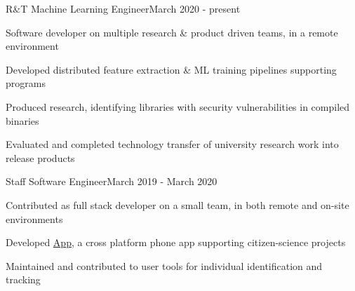\documentclass{article}
\newenvironment{**mylist}[2]{
  \subsubsection*{#1\hfill#2}
  \small
  \begin{list}{}{}
    \setlength{\topsep}{0pt}
   \setlength{\itemsep}{1pt}
   \setlength{\parskip}{0pt}
   \setlength{\parsep}{0pt}}{\end{list}\normalsize}
\newcommand{\LU}[1]{\hspace{-1em}{\bf Technologies : #1}}
\def\PT{{\bf(Part Time)}\xspace}
\begin{document}
\begin{comment}
\begin{**mylist}{Stealth Org \PT \tabb Security \& Tech Consultant}{April 2021 - present}
\item Setup technologies with a security forward perspective, including documented threat models
\item Provided resources to facilitate consolidating intelligence for a searchable library service
\item Developed tools used to monitor public streaming services and flag/share periods of interest
\item Evaluated \& incorporated Machine Learning models in facilitating search and other operations
\item \LU{Linux, NextCloud, 2FA, Signal, Tor Hidden Services, Django}
\end{**mylist}
\end{comment}

\begin{**mylist}{\href{https://www.grammatech.com}{} \tabb R\&T Machine Learning Engineer}{March 2020 - present}
\item Software developer on multiple research \& product driven teams, in a remote environment
\item Developed distributed feature extraction \& ML training pipelines supporting  programs
\item Produced research, identifying libraries with security vulnerabilities in compiled binaries
\item Evaluated and completed technology transfer of university research work into release products
\item \LU{Python, C, PyTorch, Docker, celery, Kibana, GitLab.ci, LevelDB, MongoDB}
\end{**mylist}

\begin{**mylist}{\href{www.happywhale.com}{} \tabb Staff Software Engineer}{March 2019 - March 2020}
\item Contributed as full stack developer on a small team, in both remote and on-site environments
\item Developed \href{https://play.google.com/store/apps/details?id=com.animalus.scidir&hl=en_US}{ App}, a cross platform phone app supporting citizen-science projects
\item Maintained and contributed to user tools for individual  identification and tracking
\item \LU{Native/TypeScript, Angular, Android, iOS, PostgreSQL, Java, Spring, firebase}
\end{**mylist}
\end{document}
